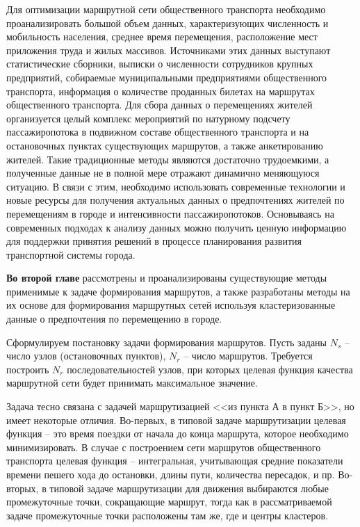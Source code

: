 Для оптимизации маршрутной сети общественного транспорта необходимо проанализировать большой объем данных, 
характеризующих численность и мобильность населения, среднее время перемещения, расположение мест приложения 
труда и жилых массивов. Источниками этих данных выступают статистические сборники, выписки о численности 
сотрудников крупных предприятий, собираемые муниципальными предприятиями общественного транспорта, 
информация о количестве проданных билетах на маршрутах общественного транспорта. Для сбора данных о 
перемещениях жителей организуется целый комплекс мероприятий по натурному подсчету пассажиропотока в 
подвижном составе общественного транспорта и на остановочных пунктах существующих маршрутов, а также 
анкетированию жителей. Такие традиционные методы являются достаточно трудоемкими, а полученные данные не в 
полной мере отражают динамично меняющуюся ситуацию. В связи с этим, необходимо использовать современные 
технологии и новые ресурсы для получения актуальных данных о предпочтениях жителей по перемещениям в городе 
и интенсивности пассажиропотоков. Основываясь на современных подходах к анализу данных можно получить 
ценную информацию для поддержки принятия решений в процессе планирования развития транспортной системы 
города.

\textbf{Во второй главе} рассмотрены и проанализированы существующие методы применимые к задаче формирования 
маршрутов, а также разработаны методы на их основе для формирования маршрутных сетей используя 
кластеризованные данные о предпочтения по перемещению в городе.

Сформулируем постановку задачи формирования маршрутов. Пусть заданы \( N_s \) – число узлов (остановочных 
пунктов), \( N_r \) – число маршрутов. Требуется построить \( N_r \) последовательностей узлов, при которых 
целевая функция качества маршрутной сети будет принимать максимальное значение. 

Задача тесно связана с задачей маршрутизацией <<из пункта А в пункт Б>>, но имеет некоторые отличия. 
Во-первых, в типовой задаче маршрутизации целевая функция – это время поездки от начала до конца маршрута, 
которое необходимо минимизировать. В случае с построением сети маршрутов общественного транспорта целевая 
функция -- интегральная, учитывающая средние показатели времени пешего хода до остановки, длины пути, 
количества пересадок, и пр. Во-вторых, в типовой задаче маршрутизации для движения выбираются любые 
промежуточные точки, сокращающие маршрут, тогда как в рассматриваемой задаче промежуточные точки 
расположены там же, где и центры кластеров.

